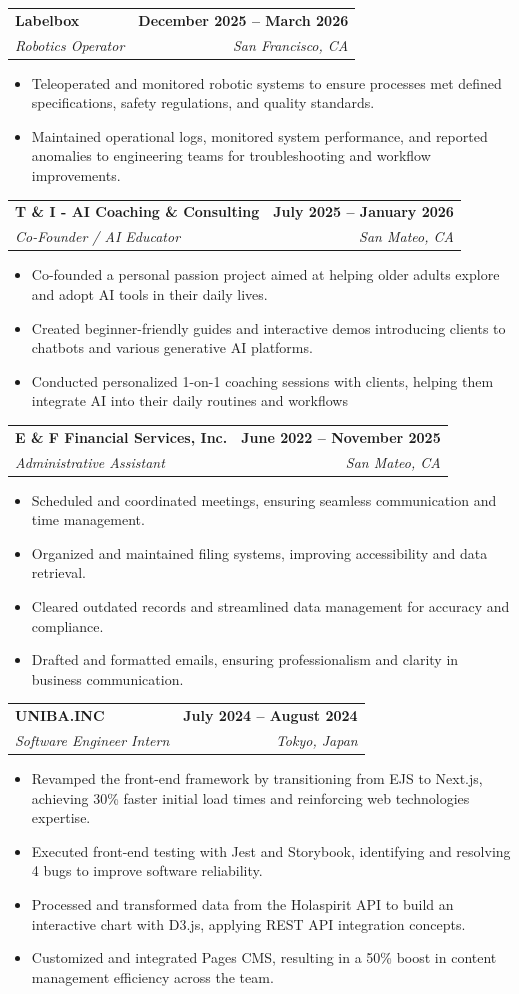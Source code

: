 \documentclass[letterpaper,11pt]{article}
\makeatletter
\newcommand{\resumeItem}[1]{
  \item\small{
    {#1\vspace{-2pt}}
  }
}
\newcommand{\resumeSubheading}[4]{
  \vspace{-2pt}\item
    \begin{tabular*}{\textwidth}[t]{l@{\extracolsep{\fill}}r}
      \textbf{#1} & \textbf{#2} \\
      \textit{\small#3} & \textit{\small #4} \\
    \end{tabular*}\vspace{-7pt}
}
\newcommand{\resumeItemListStart}{\begin{itemize}}
\newcommand{\resumeItemListEnd}{\end{itemize}\vspace{-5pt}}
\makeatother
\begin{document}
    \resumeSubheading
      {Labelbox}{December 2025 -- March 2026}
      {Robotics Operator}{San Francisco, CA}
      \resumeItemListStart
        \resumeItem{Teleoperated and monitored robotic systems to ensure processes met defined specifications, safety regulations, and quality standards.}
        \resumeItem{Maintained operational logs, monitored system performance, and reported anomalies to engineering teams for troubleshooting and workflow improvements.}
      \resumeItemListEnd

    \resumeSubheading
      {T \& I - AI Coaching \& Consulting}{July 2025 -- January 2026}
      {Co-Founder / AI Educator}{San Mateo, CA}
      \resumeItemListStart
        \resumeItem{Co-founded a personal passion project aimed at helping older adults explore and adopt AI tools in their daily lives.}
        \resumeItem{Created beginner-friendly guides and interactive demos introducing clients to chatbots and various generative AI platforms.}
        \resumeItem{Conducted personalized 1-on-1 coaching sessions with clients, helping them integrate AI into their daily routines and workflows}
      \resumeItemListEnd

    \resumeSubheading
      {E \& F Financial Services, Inc.}{June 2022 -- November 2025}
      {Administrative Assistant}{San Mateo, CA}
      \resumeItemListStart
        \resumeItem{Scheduled and coordinated meetings, ensuring seamless communication and time management.}
        \resumeItem{Organized and maintained filing systems, improving accessibility and data retrieval.}
        \resumeItem{Cleared outdated records and streamlined data management for accuracy and compliance.}
        \resumeItem{Drafted and formatted emails, ensuring professionalism and clarity in business communication.}
      \resumeItemListEnd

    \resumeSubheading
      {UNIBA.INC}{July 2024 -- August 2024}
      {Software Engineer Intern}{Tokyo, Japan}
      \resumeItemListStart
        \resumeItem{Revamped the front-end framework by transitioning from EJS to Next.js, achieving 30\% faster initial load times and reinforcing web technologies expertise.}
        \resumeItem{Executed front-end testing with Jest and Storybook, identifying and resolving 4 bugs to improve software reliability.}
        \resumeItem{Processed and transformed data from the Holaspirit API to build an interactive chart with D3.js, applying REST API integration concepts.}
        \resumeItem{Customized and integrated Pages CMS, resulting in a 50\% boost in content management efficiency across the team.}
      \resumeItemListEnd
\end{document}
